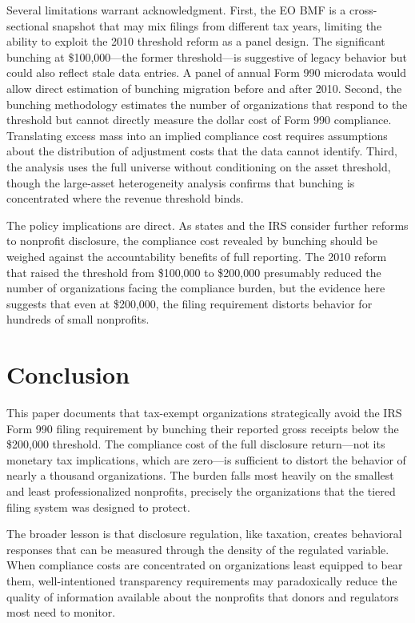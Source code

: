 \documentclass[12pt]{article}
\begin{document}
Several limitations warrant acknowledgment. First, the EO BMF is a cross-sectional snapshot that may mix filings from different tax years, limiting the ability to exploit the 2010 threshold reform as a panel design. The significant bunching at \$100,000---the former threshold---is suggestive of legacy behavior but could also reflect stale data entries. A panel of annual Form 990 microdata would allow direct estimation of bunching migration before and after 2010. Second, the bunching methodology estimates the number of organizations that respond to the threshold but cannot directly measure the dollar cost of Form 990 compliance. Translating excess mass into an implied compliance cost requires assumptions about the distribution of adjustment costs that the data cannot identify. Third, the analysis uses the full universe without conditioning on the asset threshold, though the large-asset heterogeneity analysis confirms that bunching is concentrated where the revenue threshold binds.

The policy implications are direct. As states and the IRS consider further reforms to nonprofit disclosure, the compliance cost revealed by bunching should be weighed against the accountability benefits of full reporting. The 2010 reform that raised the threshold from \$100,000 to \$200,000 presumably reduced the number of organizations facing the compliance burden, but the evidence here suggests that even at \$200,000, the filing requirement distorts behavior for hundreds of small nonprofits.

\section{Conclusion}

This paper documents that tax-exempt organizations strategically avoid the IRS Form 990 filing requirement by bunching their reported gross receipts below the \$200,000 threshold. The compliance cost of the full disclosure return---not its monetary tax implications, which are zero---is sufficient to distort the behavior of nearly a thousand organizations. The burden falls most heavily on the smallest and least professionalized nonprofits, precisely the organizations that the tiered filing system was designed to protect.

The broader lesson is that disclosure regulation, like taxation, creates behavioral responses that can be measured through the density of the regulated variable. When compliance costs are concentrated on organizations least equipped to bear them, well-intentioned transparency requirements may paradoxically reduce the quality of information available about the nonprofits that donors and regulators most need to monitor.
\end{document}
